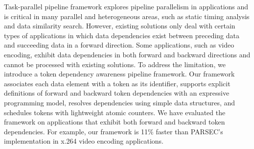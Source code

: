 Task-parallel pipeline framework explores pipeline parallelism in applications and is critical in many parallel and heterogeneous areas, such as static timing analysis and data similarity search. However, existing solutions only deal with certain types of applications in which data dependencies exist between preceding data and succeeding data in a forward direction. Some applications, such as video encoding, exhibit data dependencies in both forward and backward directions and cannot be processed with existing solutions. To address the limitation, we introduce a token dependency awareness pipeline framework. Our framework associates each data element with a token as its identifier, supports explicit definitions of forward and backward token dependencies with an expressive programming model, resolves dependencies using simple data structures, and schedules tokens with lightweight atomic counters. We have evaluated the framework on applications that exhibit both forward and backward token dependencies. For example, our framework is 11\% faster than PARSEC's implementation in x.264 video encoding applications.
